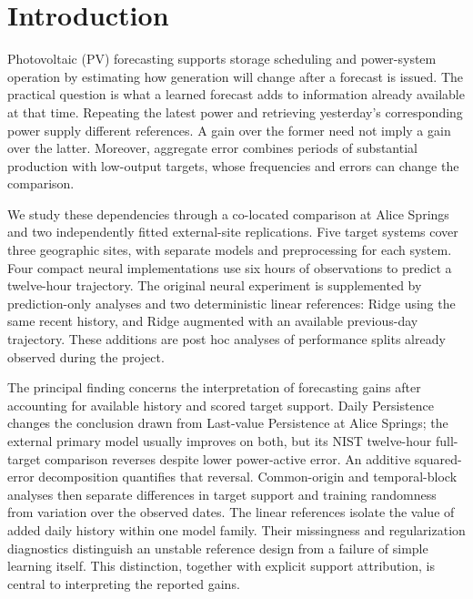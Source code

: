 \documentclass[aip,reprint,floatfix,amsmath,amssymb]{revtex4-2}
\begin{document}
\section{Introduction}
Photovoltaic (PV) forecasting supports storage scheduling and power-system operation by estimating how generation will change after a forecast is issued. The practical question is what a learned forecast adds to information already available at that time. Repeating the latest power and retrieving yesterday's corresponding power supply different references. A gain over the former need not imply a gain over the latter. Moreover, aggregate error combines periods of substantial production with low-output targets, whose frequencies and errors can change the comparison.\cite{Antonanzas2016,Mellit2021Review,Hyndman2006}

We study these dependencies through a co-located comparison at Alice Springs and two independently fitted external-site replications. Five target systems cover three geographic sites, with separate models and preprocessing for each system. Four compact neural implementations use six hours of observations to predict a twelve-hour trajectory. The original neural experiment is supplemented by prediction-only analyses and two deterministic linear references: Ridge using the same recent history, and Ridge augmented with an available previous-day trajectory. These additions are post hoc analyses of performance splits already observed during the project.

The principal finding concerns the interpretation of forecasting gains after accounting for available history and scored target support. Daily Persistence changes the conclusion drawn from Last-value Persistence at Alice Springs; the external primary model usually improves on both, but its NIST twelve-hour full-target comparison reverses despite lower power-active error. An additive squared-error decomposition quantifies that reversal. Common-origin and temporal-block analyses then separate differences in target support and training randomness from variation over the observed dates. The linear references isolate the value of added daily history within one model family. Their missingness and regularization diagnostics distinguish an unstable reference design from a failure of simple learning itself. This distinction, together with explicit support attribution, is central to interpreting the reported gains.
\end{document}
